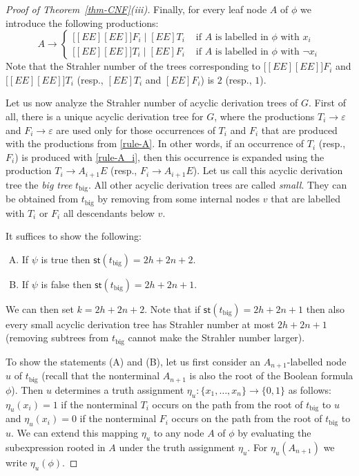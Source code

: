 \documentclass[a4paper,UKenglish,cleveref, autoref, thm-restate, numberwithinsect]{lipics-v2021}
\newcommand{\hs}{\mathsf{st}}
\begin{document}
\begin{proof}[Proof of Theorem~\ref{thm-CNF}(iii)]
Finally, for every leaf node $A$ of $\phi$ we introduce the following productions:
\begin{equation} \label{rule-A}
A  \to 
\begin{cases}
\big[ [EE][EE] \big] F_i \mid  [EE] T_i  & \text{ if $A$ is labelled in $\phi$ with $x_i$}  \\[1mm]
\big[ [EE][EE] \big] T_i \mid  [EE] F_i   & \text{ if $A$ is labelled in $\phi$ with $\neg x_i$} 
\end{cases} 
\end{equation}
Note that the Strahler number of the trees corresponding to $\big[ [EE][EE] \big] F_i$ and 
$\big[ [EE][EE] \big] T_i$ (resp.,  $[EE] T_i$ and $[EE] F_i$) is $2$ (resp., $1$).


Let us now analyze the Strahler number of acyclic derivation trees of $G$. 
First of all, there is a unique acyclic derivation tree for $G$, where the productions $T_i \to \varepsilon$ and $F_i \to \varepsilon$ are used
only for those occurrences of $T_i$ and $F_i$ that are produced with the productions from \eqref{rule-A}. In other words, if an 
occurrence of $T_i$ (resp., $F_i$) is produced with \eqref{rule-A_i}, then this occurrence is expanded using the production
$T_i \to A_{i+1} E$ (resp., $F_i \to A_{i+1} E$).  Let us call this acyclic derivation tree the \emph{big tree} $t_{\text{big}}$. 
All other acyclic derivation trees are called
\emph{small}. They can be obtained from $t_{\text{big}}$ by removing from some internal nodes $v$ that are labelled with $T_i$ or $F_i$
all descendants below $v$.

It suffices to show the following:
\begin{enumerate}[(A)]
\item If $\psi$ is true then $\hs(t_{\text{big}}) = 2h+2n+2$.
\item If $\psi$ is false then $\hs(t_{\text{big}}) = 2h+2n+1$.
\end{enumerate}
We can then set $k = 2h+2n+2$. Note that if $\hs(t_{\text{big}}) = 2h+2n+1$ then also every small 
acyclic derivation tree has Strahler number at most $2h+2n+1$
 (removing subtrees from $t_{\text{big}}$ cannot
make the Strahler number larger).


To show the statements (A) and (B), let us first consider an $A_{n+1}$-labelled node $u$ of $t_{\text{big}}$ (recall that the nonterminal
$A_{n+1}$ is also the root of the Boolean formula $\phi$). Then $u$ determines a truth assignment 
$\eta_u : \{x_1, \ldots, x_n\} \to \{0,1\}$ as follows:
$\eta_u(x_i) = 1$ if the nonterminal $T_i$ occurs on the path from the root of $t_{\text{big}}$ to $u$ and
$\eta_u(x_i) = 0$ if the nonterminal $F_i$ occurs on the path from the root of $t_{\text{big}}$ to $u$.
 We can extend this mapping $\eta_u$ to any node $A$ of $\phi$ by evaluating the  subexpression rooted in $A$ under
the truth assignment $\eta_u$. For $\eta_u(A_{n+1})$ we write $\eta_u(\phi)$. 



\end{proof}
\end{document}
